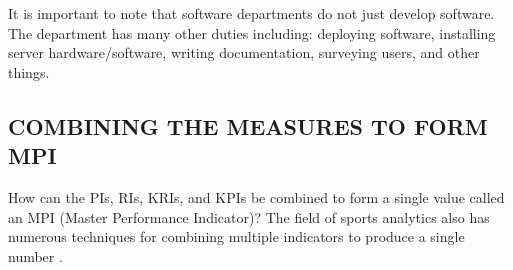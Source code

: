 \documentclass[SDSUThesis.tex]{subfiles}
\begin{document}
It is important to note that software departments do not just
develop software.  The department has many other duties
including: deploying software, installing server hardware/software,
writing documentation, surveying users, and other things.

\subsection{COMBINING THE MEASURES TO FORM MPI}

How can the PIs, RIs, KRIs, and KPIs be combined to form a single
value called an MPI (Master Performance Indicator)?  The field
of sports analytics also has numerous techniques for combining
multiple indicators to produce a single number \cite{Cervone2014}.
\end{document}
